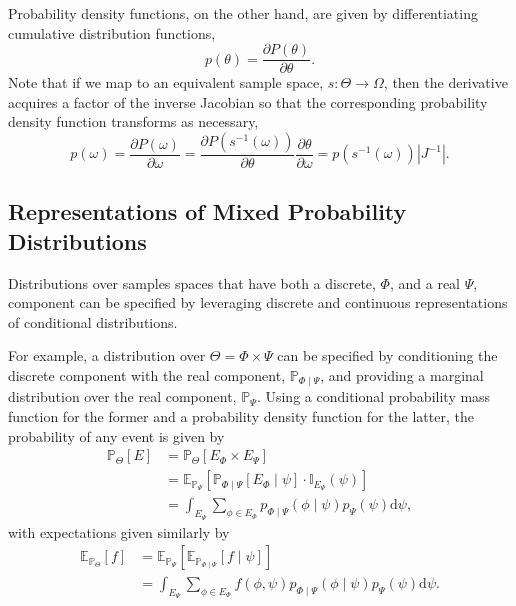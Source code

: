 \documentclass[11pt, oneside]{article}
\newcommand{\dd}{ \mathrm{d} }
\newcommand{\PP}{ \mathbb{P} }
\newcommand{\EE}{ \mathbb{E} }
\begin{document}
Probability density functions, on the other hand, are given by 
differentiating cumulative distribution functions,
%
\begin{equation*}
p \! \left( \theta \right) = 
\frac{\partial P \! \left( \theta \right) }{ \partial \theta}.
\end{equation*}
%
Note that if we map to an equivalent sample space, 
$s : \Theta \rightarrow \Omega$, then the derivative
acquires a factor of the inverse Jacobian so that the
corresponding probability density function transforms
as necessary,
%
\begin{equation*}
p \! \left( \omega \right) 
= 
\frac{\partial P \! \left( \omega \right) }{ \partial \omega}
=
\frac{\partial P \! \left( s^{-1} \! \left( \omega \right) \right) }
{ \partial \theta}
\frac{ \partial \theta }{ \partial \omega }
= 
p \! \left( s^{-1} \! \left( \omega \right) \right) \left| J^{-1} \right|.
\end{equation*}

\subsection{Representations of Mixed Probability Distributions}

Distributions over samples spaces that have both a discrete, $\Phi$,
and a real $\Psi$, component can be specified by leveraging 
discrete and continuous representations of conditional distributions.  

For example, a distribution over $\Theta = \Phi \times \Psi$ can be
specified by conditioning the discrete component with the real
component, $\PP_{\Phi \mid \Psi}$, and providing a marginal distribution
over the real component, $\PP_{\Psi}$.  Using a conditional
probability mass function for the former and a probability density function
for the latter, the probability of any event is given by
%
\begin{align*}
\PP_{\Theta} \! \left[ E \right]
&=
\PP_{\Theta} \! \left[ E_{\Phi} \times E_{\Psi} \right]
\\
&=
\EE_{\PP_{\Psi}} \! \left[
\PP_{\Phi \mid \Psi} \! \left[  E_{\Phi} \mid \psi \right]
\cdot
\mathbb{I}_{E_{\Psi}} \! \left( \psi \right)
\right] 
\\
&= 
\int_{E_{\Psi} }
\sum_{\phi \in E_{\Phi} } p_{\Phi \mid \Psi} \! \left( \phi \mid \psi \right)
p_{\Psi} \! \left( \psi \right) \dd \psi,
\end{align*}
%
with expectations given similarly by
%
\begin{align*}
\EE_{\PP_{\Theta}} \! \left[ f \right]
&=
\EE_{\PP_{\Psi}} \! \left[
\EE_{\PP_{\Phi \mid \Psi}} \! \left[  f \mid \psi \right]
\right] 
\\
&= 
\int_{E_{\Psi} } \sum_{\phi \in E_{\Phi} } f \! \left( \phi, \psi \right) 
p_{\Phi \mid \Psi} \! \left( \phi \mid \psi \right)
p_{\Psi} \! \left( \psi \right) \dd \psi.
\end{align*}
\end{document}
